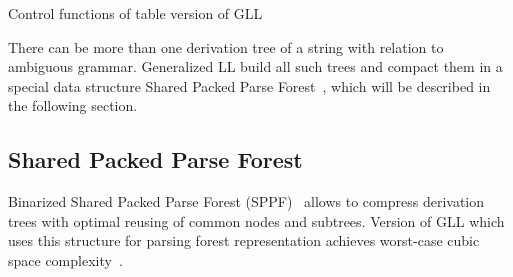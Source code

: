 \begin{algorithm}[h]
\begin{algorithmic}[1]
\caption{Control functions of table version of GLL}
\label{mainTblFunctions}
  \Else
  \EndIf
\EndFunction

       \Else 
       \EndIf
       \EndIf
  \EndCase
       \EndFor
  \EndCase
  \EndCase
  \EndCase
  \EndSwitch
\EndFunction

      \Else
      \EndIf
  \EndWhile
\EndFunction

\end{algorithmic}
\end{algorithm}

There can be more than one derivation tree of a string with relation to ambiguous grammar.
Generalized LL build all such trees and compact them in a special data structure Shared Packed Parse Forest~\cite{SPPF}, which will be described in the following section.

\subsection{Shared Packed Parse Forest}

Binarized Shared Packed Parse Forest (SPPF)~\cite{brnglr} allows to compress derivation trees with optimal reusing of common nodes and subtrees.
Version of GLL which uses this structure for parsing forest representation achieves worst-case cubic space complexity~\cite{gllParsingTree}.


